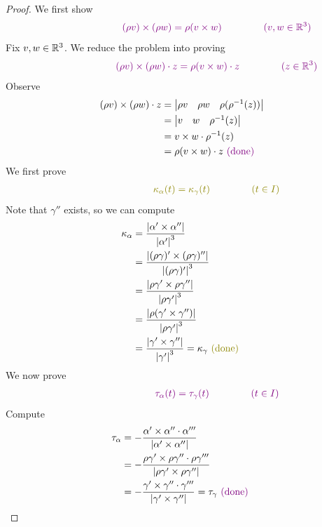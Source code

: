\documentclass{report}
\begin{document}
\begin{proof}
We first show 
\begin{align*}
\textcolor{violet}{\hspace{2.5cm}(\rho v) \times (\rho w)=\rho (v\times w)\hspace{1.5cm}(v,w\in\mathbb{R}^3)}
\end{align*}
Fix $v,w\in\mathbb{R}^3$. We reduce the problem into proving 
\begin{align*}
  \textcolor{violet}{\hspace{2.5cm}(\rho v)\times (\rho w)\cdot z=\rho (v\times w)\cdot z\hspace{1.5cm}(z\in\mathbb{R}^3)}
\end{align*}
Observe 
\begin{align*}
  (\rho v)\times (\rho w) \cdot z &= \begin{vmatrix} 
    \rho v & \rho w & \rho(\rho^{-1}(z) )
  \end{vmatrix}\\
  &=\begin{vmatrix} 
    v & w & \rho^{-1}(z)
  \end{vmatrix}\\
  &=v \times w \cdot \rho^{-1}(z)\\
  &=\rho (v\times w)\cdot z \textcolor{violet}{\text{ (done) }}
\end{align*}
We first prove 
\begin{align*}
  \olive{\hspace{2.5cm}\kappa_\alpha (t)=\kappa_\gamma (t)\hspace{1.5cm}(t \in I)}
\end{align*}
Note that $\gamma ''$ exists, so we can compute 
\begin{align*}
\kappa_\alpha &= \frac{\abso{\alpha ' \times \alpha''}}{\abso{\alpha '}^3}\\
&=\frac{\abso{(\rho \gamma )'\times (\rho  \gamma )''}}{\abso{(\rho\gamma )'}^3}\\
&=\frac{\abso{\rho \gamma '\times \rho \gamma ''}}{\abso{\rho \gamma '}^3}\\
&=\frac{\abso{\rho (\gamma '\times \gamma '')}}{\abso{\rho \gamma '}^3}\\
&=\frac{\abso{\gamma '\times \gamma ''}}{\abso{\gamma '}^3}=\kappa_\gamma \odone
\end{align*}
We now prove 
\begin{align*}
  \textcolor{violet}{\hspace{2.5cm}\tau_\alpha (t)=\tau_\gamma (t)\hspace{1.5cm}(t \in I)}
\end{align*}
Compute 
\begin{align*}
\tau_\alpha &=-\frac{\alpha '\times \alpha '' \cdot \alpha '''}{\left|\alpha '\times \alpha'' \right|}\\
&=-\frac{\rho \gamma  ' \times \rho \gamma '' \cdot \rho \gamma '''}{\left|\rho \gamma '\times \rho \gamma ''\right|}\\
&=-\frac{\gamma '\times \gamma '' \cdot \gamma '''}{\left|\gamma '\times \gamma ''\right|}=\tau_\gamma \textcolor{violet}{\text{ (done) }}
\end{align*}


\end{proof}
\end{document}
